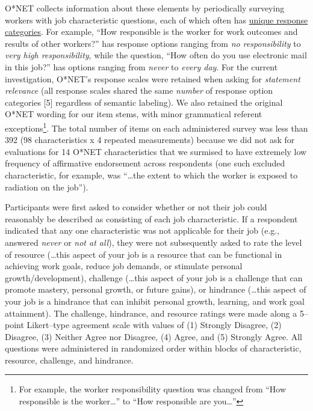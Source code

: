\documentclass[
  man]{apa7}
\begin{document}
O*NET collects information about these elements by periodically surveying workers with job characteristic questions, each of which often has \href{https://www.ONETonline.org/find/descriptor/result/4.C.1.c.2}{unique response categories}. For example, ``How responsible is the worker for work outcomes and results of other workers?'' has response options ranging from \emph{no responsibility} to \emph{very high responsibility}, while the question, ``How often do you use electronic mail in this job?'' has options ranging from \emph{never} to \emph{every day}. For the current investigation, O*NET's response scales were retained when asking for \emph{statement relevance} (all response scales shared the same \emph{number} of response option categories {[}5{]} regardless of semantic labeling). We also retained the original O*NET wording for our item stems, with minor grammatical referent exceptions\footnote{For example, the worker responsibility question was changed from ``How responsible is the worker\ldots{}'' to ``How responsible are you\ldots{}''}. The total number of items on each administered survey was less than 392 (98 characteristics x 4 repeated measurements) because we did not ask for evaluations for 14 O*NET characteristics that we surmised to have extremely low frequency of affirmative endorsement across respondents (one such excluded characteristic, for example, was ``\ldots the extent to which the worker is exposed to radiation on the job'').

Participants were first asked to consider whether or not their job could reasonably be described as consisting of each job characteristic. If a respondent indicated that any one characteristic was not applicable for their job (e.g., answered \emph{never} or \emph{not at all}), they were not subsequently asked to rate the level of resource (\ldots this aspect of your job is a resource that can be functional in achieving work goals, reduce job demands, or stimulate personal growth/development), challenge (\ldots this aspect of your job is a challenge that can promote mastery, personal growth, or future gains), or hindrance (\ldots this aspect of your job is a hindrance that can inhibit personal growth, learning, and work goal attainment). The challenge, hindrance, and resource ratings were made along a 5--point Likert--type agreement scale with values of (1) Strongly Disagree, (2) Disagree, (3) Neither Agree nor Disagree, (4) Agree, and (5) Strongly Agree. All questions were administered in randomized order within blocks of characteristic, resource, challenge, and hindrance.
\end{document}
